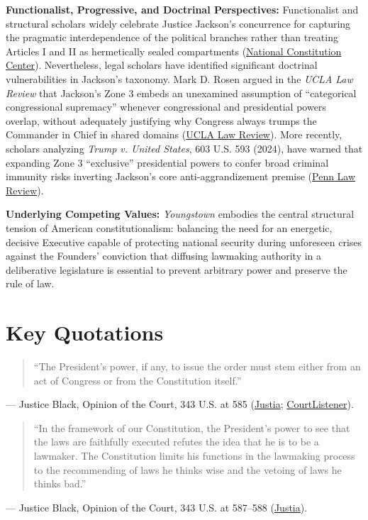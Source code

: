 \documentclass[12pt]{article}
\begin{document}
\textbf{Functionalist, Progressive, and Doctrinal Perspectives:} Functionalist and structural scholars widely celebrate Justice Jackson's concurrence for capturing the pragmatic interdependence of the political branches rather than treating Articles I and II as hermetically sealed compartments (\href{https://constitutioncenter.org/blog/the-youngstown-case-three-approaches-to-interpreting-presidential-power}{National Constitution Center}). Nevertheless, legal scholars have identified significant doctrinal vulnerabilities in Jackson's taxonomy. Mark D. Rosen argued in the \textit{UCLA Law Review} that Jackson's Zone 3 embeds an unexamined assumption of ``categorical congressional supremacy'' whenever congressional and presidential powers overlap, without adequately justifying why Congress always trumps the Commander in Chief in shared domains (\href{https://www.uclalawreview.org/wp-content/uploads/2019/09/44_54UCLALRev1703August2007.pdf}{UCLA Law Review}). More recently, scholars analyzing \textit{Trump v. United States}, 603 U.S. 593 (2024), have warned that expanding Zone 3 ``exclusive'' presidential powers to confer broad criminal immunity risks inverting Jackson's core anti-aggrandizement premise (\href{https://pennlawreview.com/2026/03/06/power-and-immunity-in-youngstown-and-trump-v-united-states/}{Penn Law Review}).

\textbf{Underlying Competing Values:} \textit{Youngstown} embodies the central structural tension of American constitutionalism: balancing the need for an energetic, decisive Executive capable of protecting national security during unforeseen crises against the Founders' conviction that diffusing lawmaking authority in a deliberative legislature is essential to prevent arbitrary power and preserve the rule of law.

\section{Key Quotations}

\begin{quote}
``The President's power, if any, to issue the order must stem either from an act of Congress or from the Constitution itself.''
\end{quote}
\noindent --- Justice Black, Opinion of the Court, 343 U.S. at 585 (\href{https://supreme.justia.com/cases/federal/us/343/579/}{Justia}; \href{https://www.courtlistener.com/opinion/105018/youngstown-sheet-tube-co-v-sawyer/}{CourtListener}).

\begin{quote}
``In the framework of our Constitution, the President's power to see that the laws are faithfully executed refutes the idea that he is to be a lawmaker. The Constitution limits his functions in the lawmaking process to the recommending of laws he thinks wise and the vetoing of laws he thinks bad.''
\end{quote}
\noindent --- Justice Black, Opinion of the Court, 343 U.S. at 587--588 (\href{https://supreme.justia.com/cases/federal/us/343/579/}{Justia}).
\end{document}
